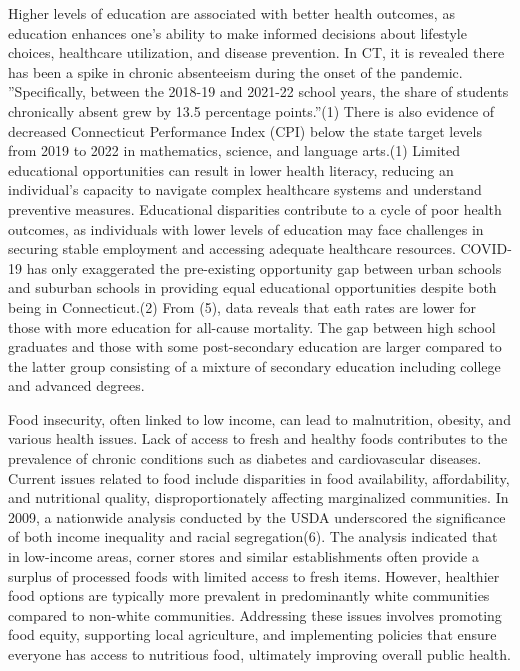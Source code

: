 \documentclass[12pt]{article}
\begin{document}
Higher levels
of education are associated with better
health outcomes, as education enhances
one's ability to make informed decisions
about lifestyle choices, healthcare
utilization, and disease prevention. In CT, it is revealed there has been a spike in chronic absenteeism during the onset of the pandemic.
''Specifically, between the 2018-19 and 2021-22 school years, the share of students chronically absent grew by 13.5 percentage points.''(1)
There is also evidence of decreased Connecticut Performance Index (CPI) below the state target levels from 2019 to 2022 in mathematics, science,
and language arts.(1)
Limited educational opportunities can
result in lower health literacy, reducing
an individual's capacity to navigate
complex healthcare systems and understand
preventive measures. Educational
disparities contribute to a cycle of
poor health outcomes, as individuals
with lower levels of education may face
challenges in securing stable employment
and accessing adequate healthcare
resources. COVID-19 has only exaggerated
the pre-existing opportunity gap between urban schools and suburban schools in providing equal educational
opportunities despite both being in Connecticut.(2)
From (5), data reveals that  eath rates are lower for those with more education for all-cause mortality. 
The gap between high school graduates and those with some post-secondary education are larger compared to the latter group consisting
of a mixture of secondary education including college and advanced degrees.

Food insecurity,
often linked to low income, can lead to
malnutrition, obesity, and various health
issues. Lack of access to fresh and
healthy foods contributes to the prevalence
of chronic conditions such as diabetes
and cardiovascular diseases. Current
issues related to food include disparities
in food availability, affordability, and
nutritional quality, disproportionately
affecting marginalized communities.
In 2009, a nationwide analysis conducted by the USDA underscored the significance of both income inequality and racial segregation(6).
The analysis indicated that in low-income areas, corner stores and similar establishments often provide 
a surplus of processed foods with limited access to fresh items. However, healthier food options are 
typically more prevalent in predominantly white communities compared to non-white communities.
Addressing these issues involves promoting
food equity, supporting local agriculture,
and implementing policies that ensure
everyone has access to nutritious food,
ultimately improving overall public health.
\end{document}
